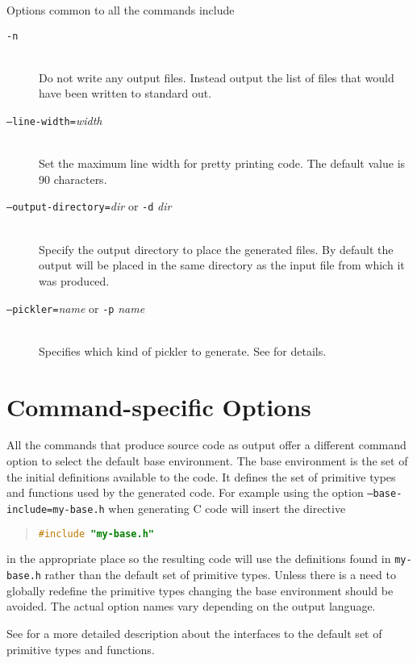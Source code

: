 Options common to all the commands include
\begin{description}
  \item[\normalfont\texttt{-n}] \mbox{}\\
    Do not write any output files.
    Instead output the list of files that would have been written to standard out.
  \item[\normalfont\texttt{--line-width=}\textit{width}] \mbox{}\\
    Set the maximum line width for pretty printing code.
    The default value is 90 characters.
  \item[\normalfont\texttt{--output-directory=}\textit{dir} or \texttt{-d} \textit{dir}] \mbox{}\\
    Specify the output directory to place the generated files.
    By default the output will be placed in the same directory as the
    input file from which it was produced.
  \item[\normalfont\texttt{--pickler=}\textit{name} or \texttt{-p} \textit{name}] \mbox{}\\
    Specifies which kind of pickler to generate.
    See  for details.
\end{description}%

\section*{Command-specific Options}

All the commands that produce source code as output offer a different
command option to select the default base environment.
The base environment is the set of the initial definitions available to the code.
It defines the set of primitive types and functions used by the generated code.
For example using the option \texttt{--base-include=my-base.h}
when generating C code will insert the directive
\begin{quote}\begin{lstlisting}[language=c]
#include "my-base.h"
\end{lstlisting}\end{quote}%
in the appropriate place so the resulting code will use the definitions found in
\texttt{my-base.h} rather than the default set of primitive types.
Unless there is a need to globally redefine
the primitive types changing the base environment should be avoided.
The actual option names vary depending on the output language.

See  for a more detailed description about the interfaces
to the default set of primitive types and functions.

